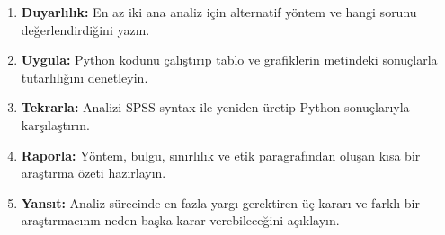 \begin{enumerate}
  \item \textbf{Duyarlılık:} En az iki ana analiz için alternatif yöntem ve hangi sorunu değerlendirdiğini yazın.
  \item \textbf{Uygula:} Python kodunu çalıştırıp tablo ve grafiklerin metindeki sonuçlarla tutarlılığını denetleyin.
  \item \textbf{Tekrarla:} Analizi SPSS syntax ile yeniden üretip Python sonuçlarıyla karşılaştırın.
  \item \textbf{Raporla:} Yöntem, bulgu, sınırlılık ve etik paragrafından oluşan kısa bir araştırma özeti hazırlayın.
  \item \textbf{Yansıt:} Analiz sürecinde en fazla yargı gerektiren üç kararı ve farklı bir araştırmacının neden başka karar verebileceğini açıklayın.
\end{enumerate}

